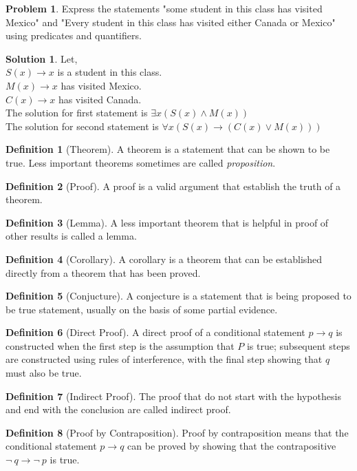 \documentclass[12pt,oneside,a4paper]{book}
\theoremstyle{remark}
\theoremstyle{definition}
\newtheorem{prob}{Problem}[section]
\newtheorem{defn}{Definition}
\newtheorem*{soln}{Solution}
\newcommand{\ptoq}{p \to q}
\begin{document}
\begin{prob}
    Express the statements "some student in this class has visited Mexico" and "Every student in this class has visited either Canada or Mexico" using predicates and quantifiers.
\end{prob}
\begin{soln}
    Let,\\
    \(S(x)\to x\) is a student in this class.\\
    \(M(x)\to x\) has visited Mexico.\\
    \(C(x)\to x\) has visited Canada.\\
    The solution for first statement is \(\exists x (S(x)\wedge M(x))\)\\
    The solution for second statement is \(\forall x (S(x)\to (C(x)\vee M(x)))\)
\end{soln}
\begin{defn}[Theorem]
    A theorem is a statement that can be shown to be true.
    Less important theorems sometimes are called \emph{proposition}.
\end{defn}
\begin{defn}[Proof]
    A proof is a valid argument that establish the truth of a theorem.
\end{defn}
\begin{defn}[Lemma]
    A less important theorem that is helpful in proof of other results is called a lemma.
\end{defn}
\begin{defn}[Corollary]
    A corollary is a theorem that can be established directly from a theorem that has been proved.
\end{defn}
\begin{defn}[Conjucture]
    A conjecture is a statement that is being proposed to be true statement, usually on the basis of some partial evidence.
\end{defn}
\begin{defn}[Direct Proof]
    A direct proof of a conditional statement \(\ptoq\) is constructed when the first step is the assumption that $ P $ is true; subsequent steps are constructed using rules of interference, with the final step showing that \(q\) must also be true.
\end{defn}
\begin{defn}[Indirect Proof]
    The proof that do not start with the hypothesis and end with the conclusion are called indirect proof.
\end{defn}
\begin{defn}[Proof by Contraposition]
    Proof by contraposition means that the conditional statement \(\ptoq\) can be proved by showing that the contrapositive \(\neg\ q\to\neg\ p\) is true.
\end{defn}
\end{document}
